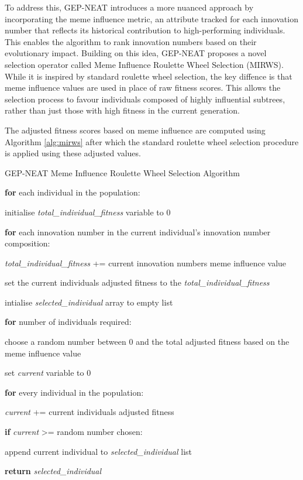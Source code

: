 \parbreak\noindent To address this, GEP-NEAT introduces a more nuanced approach by incorporating the meme influence metric, an attribute tracked for each innovation number that reflects its historical contribution to high-performing individuals. This enables the algorithm to rank innovation numbers based on their evolutionary impact. Building on this idea, GEP-NEAT proposes a novel selection operator called Meme Influence Roulette Wheel Selection (MIRWS). While it is inspired by standard roulette wheel selection, the key diffence is that meme influence values are used in place of raw fitness scores. This allows the selection process to favour individuals composed of highly influential subtrees, rather than just those with high fitness in the current generation.

\parbreak\noindent The adjusted fitness scores based on meme influence are computed using Algorithm \ref{alg:mirws} after which the standard roulette wheel selection procedure is applied using these adjusted values.

\parbreak
\begin{algorithm}[H]
	\caption{GEP-NEAT Meme Influence Roulette Wheel Selection Algorithm}\label{alg:mirws}
	\begin{algorithmic}[1]
	\item \textbf{for} each individual in the population:
	\item \quad initialise \textit{total\_individual\_fitness} variable to 0
	\item \quad \textbf{for} each innovation number in the current individual's innovation number composition:
	\item \quad \quad \textit{total\_individual\_fitness} += current innovation numbers meme influence value
	\item \quad set the current individuals adjusted fitness to the \textit{total\_individual\_fitness}
	\item
	\item intialise \textit{selected\_individual} array to empty list
	\item \textbf{for} number of individuals required:
	\item \quad choose a random number between 0 and the total adjusted fitness based on the meme influence value
	\item \quad set \textit{current} variable to 0
	\item \quad \textbf{for} every individual in the population:
	\item \quad \quad \textit{current} += current individuals adjusted fitness
	\item \quad \quad \textbf{if} \textit{current} >= random number chosen:
	\item \quad \quad \quad append current individual to \textit{selected\_individual} list
	\item \textbf{return} \textit{selected\_individual}
\end{algorithmic}
\end{algorithm}


